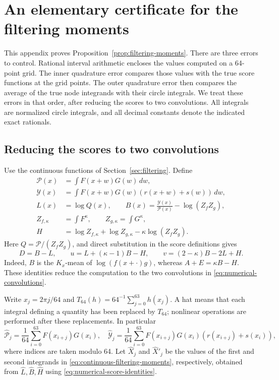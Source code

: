 \section{An elementary certificate for the filtering moments}\label{app:numerical}

This appendix proves Proposition~\ref{prop:filtering-moments}.  There
are three errors to control.  Rational interval arithmetic encloses the
values computed on a 64-point grid.  The inner quadrature error compares
those values with the true score functions at the grid points.  The
outer quadrature error then compares the average of the true node
integrands with their circle integrals.  We treat these errors in that
order, after reducing the scores to two convolutions.
All integrals are normalized circle integrals, and all decimal
constants denote the indicated exact rationals.

\subsection{Reducing the scores to two convolutions}

Use the continuous functions of Section~\ref{sec:filtering}.  Define
\begin{equation}\label{eq:numerical-convolutions}
\begin{split}
 \mathcal P(x)&=\int F(x+w)G(w)\,dw,\\
 \mathcal Y(x)&=\int F(x+w)G(w)(r(x+w)+s(w))\,dw,\\
 L(x)&=\log Q(x),\qquad
 B(x)=\frac{\mathcal Y(x)}{\mathcal P(x)}-\log(Z_fZ_g),\\
 Z_{f,\kappa}&=\int F^\kappa,\qquad Z_{g,\kappa}=\int G^\kappa,\\
 H&=\log Z_{f,\kappa}+\log Z_{g,\kappa}
          -\kappa\log(Z_fZ_g).
\end{split}
\end{equation}
Here $Q=\mathcal P/(Z_fZ_g)$, and direct substitution in the score
definitions gives
\begin{equation}\label{eq:numerical-score-identities}
 D=B-L,\qquad
 u=L+(\kappa-1)B-H,\qquad
 v=(2-\kappa)B-2L+H.
\end{equation}
Indeed, $B$ is the $K_x$-mean of $\log(f(x+\cdot)g)$, whereas
$A+E=\kappa B-H$.  These identities reduce the computation to the two
convolutions in \eqref{eq:numerical-convolutions}.

Write $x_j=2\pi j/64$ and
$T_{64}(h)=64^{-1}\sum_{j=0}^{63}h(x_j)$.  A hat means that each
integral defining a quantity has been replaced by $T_{64}$; nonlinear
operations are performed after these replacements.  In particular
\[
 \widehat{\mathcal P}_j=\frac1{64}\sum_{i=0}^{63}F(x_{i+j})G(x_i),
 \quad
 \widehat{\mathcal Y}_j=\frac1{64}\sum_{i=0}^{63}
 F(x_{i+j})G(x_i)(r(x_{i+j})+s(x_i)),
\]
where indices are taken modulo 64.  Let $\widehat X_j$ and
$\widehat X'_j$ be the values of the first and second integrands in
\eqref{eq:continuous-filtering-moments}, respectively, obtained from
$\widehat L,\widehat B,\widehat H$ using
\eqref{eq:numerical-score-identities}.

